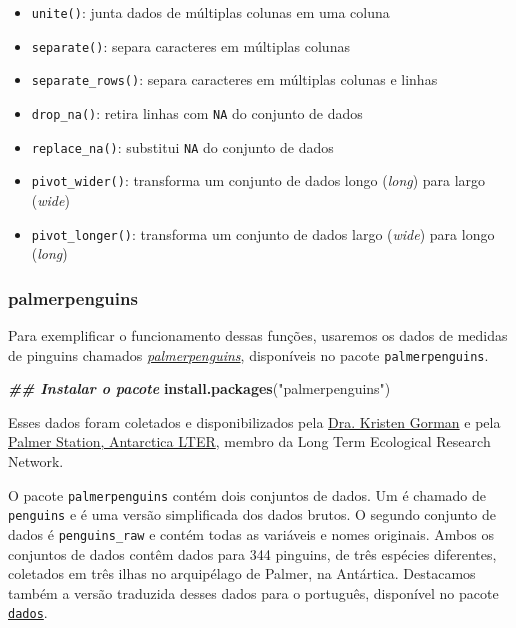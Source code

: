 \documentclass[
]{article}
\newenvironment{Shaded}{\begin{snugshade}}{\end{snugshade}}
\newcommand{\DocumentationTok}[1]{\textcolor[rgb]{0.56,0.35,0.01}{\textbf{\textit{#1}}}}
\newcommand{\FunctionTok}[1]{\textcolor[rgb]{0.13,0.29,0.53}{\textbf{#1}}}
\newcommand{\NormalTok}[1]{#1}
\newcommand{\StringTok}[1]{\textcolor[rgb]{0.31,0.60,0.02}{#1}}
\providecommand{\tightlist}{%
  \setlength{\itemsep}{0pt}\setlength{\parskip}{0pt}}
\begin{document}
\begin{itemize}
\tightlist
\item
  \texttt{unite()}: junta dados de múltiplas colunas em uma coluna
\item
  \texttt{separate()}: separa caracteres em múltiplas colunas
\item
  \texttt{separate\_rows()}: separa caracteres em múltiplas colunas e linhas
\item
  \texttt{drop\_na()}: retira linhas com \texttt{NA} do conjunto de dados
\item
  \texttt{replace\_na()}: substitui \texttt{NA} do conjunto de dados
\item
  \texttt{pivot\_wider()}: transforma um conjunto de dados longo (\emph{long}) para largo (\emph{wide})
\item
  \texttt{pivot\_longer()}: transforma um conjunto de dados largo (\emph{wide}) para longo (\emph{long})
\end{itemize}

\hypertarget{palmerpenguins}{%
\subsubsection{palmerpenguins}\label{palmerpenguins}}

Para exemplificar o funcionamento dessas funções, usaremos os dados de medidas de pinguins chamados \href{https://allisonhorst.github.io/palmerpenguins}{\emph{palmerpenguins}}, disponíveis no pacote \texttt{palmerpenguins}.

\begin{Shaded}
\begin{Highlighting}[]
\DocumentationTok{\#\# Instalar o pacote}
\FunctionTok{install.packages}\NormalTok{(}\StringTok{"palmerpenguins"}\NormalTok{)}
\end{Highlighting}
\end{Shaded}

Esses dados foram coletados e disponibilizados pela \href{https://www.uaf.edu/cfos/people/faculty/detail/kristen-gorman.php}{Dra. Kristen Gorman} e pela \href{https://pal.lternet.edu/}{Palmer Station, Antarctica LTER}, membro da Long Term Ecological Research Network.

O pacote \texttt{palmerpenguins} contém dois conjuntos de dados. Um é chamado de \texttt{penguins} e é uma versão simplificada dos dados brutos. O segundo conjunto de dados é \texttt{penguins\_raw} e contém todas as variáveis e nomes originais. Ambos os conjuntos de dados contêm dados para 344 pinguins, de três espécies diferentes, coletados em três ilhas no arquipélago de Palmer, na Antártica. Destacamos também a versão traduzida desses dados para o português, disponível no pacote \href{https://cienciadedatos.github.io/dados/}{\texttt{dados}}.
\end{document}
